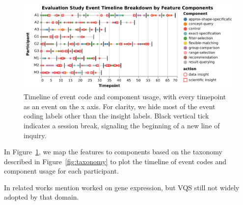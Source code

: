 
\begin{figure}[h!]
  \includegraphics[width=\linewidth]{figures/evalstudytimeline.pdf}
  \caption{Timeline of event code and component usage, with every timepoint as an event on the x axis. For clarity, we hide most of the event coding labels other than the insight labels. Black vertical tick indicates a session break, signaling the beginning of a new line of inquiry.}\label{fig:evalstudytimeline}
\end{figure}
In Figure~\ref{fig:evalstudytimeline}, we map the features to components based on the taxonomy described in Figure~\ref{fig:taxonomy} to plot the timeline of event codes and component usage for each participant.

In related works mention \cite{Hochheiser2004} worked on gene expression, but VQS still not widely adopted by that domain.

